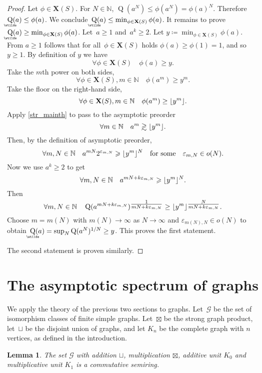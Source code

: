 \documentclass[a4paper, fleqn]{amsart}
\theoremstyle{plain}
\newtheorem{lemma}[theorem]{Lemma}
\theoremstyle{definition}
\DeclarePairedDelimiter\floor{\lfloor}{\rfloor}
\DeclareMathOperator{\subrank}{Q}
\DeclareMathOperator{\asympsubrank}{\underaccent{\wtilde}{Q}}
\newcommand{\NN}{\mathbb{N}}
\newcommand{\jeroen}[1]{#1}
\let\geqx\geqslant
\newcommand{\eps}{\varepsilon}
\newcommand{\graphs}{\mathcal{G}}
\newcommand{\aspec}{\mathbf{X}}
\let\geqx\geqslant
\newcommand{\asympgeqx}{%
  \mathrel{%
    \vphantom{\geqslant}%
    \smash{\vcenter{\doasympgeqx}}%
  }%
}
\newcommand{\doasympgeqx}{%
  \hbox{\ooalign{%
    \noalign{\kern.25ex}
    $\geqslant$\cr
    \noalign{\kern1.25ex}
    \smash{$\sim$}\cr
  }}%
}
\begin{document}
\begin{proof}
Let $\phi \in \aspec(S)$. For $N \in \NN$, $\subrank(a^N) \leq \jeroen{\phi(a^N) =  \phi(a)^N}$. Therefore $\asympsubrank(a) \leq \phi(a)$. We conclude~$\asympsubrank(a) \leq \min_{\phi \in \aspec(S)} \phi(a)$.
%
It remains to prove $\asympsubrank(a) \geq \min_{\phi \in \aspec(S)} \phi(a)$.
%
%
Let~$a\geqx 1$ and~$a^k \geqx 2$.
Let $y \coloneqq \min_{\phi \in \aspec(S)} \phi(a)$. From $a\geqx 1$ follows \jeroen{that for all~$\phi \in \aspec(S)$ holds $\phi(a) \geq \phi(1) = 1$}, and so~$y \geq1$. By definition of $y$ we have
\[
\forall \phi \in \aspec(S)\quad \phi(a) \geq y.
\]
Take the $m$th power on both sides,
\[
\forall \phi \in \aspec(S), m \in \NN\quad \phi(a^m) \geq y^m.
\]
Take the floor on the right-hand side,
\[
\forall \phi \in \aspec(S), m \in \NN\quad \phi(a^m) \geq \floor{y^m}. %
\]
Apply \cref{str_mainth} to pass to the asymptotic preorder
\[
\forall m \in \NN\quad a^m \asympgeqx \floor{y^m}.
\]
Then, by the definition of asymptotic preorder,
\[
\forall m,N \in \NN\quad a^{m N} 2^{\eps_{m,N}} \geqx \floor{y^m}^{N}\quad\textnormal{for some}\quad \eps_{m,N} \in o(N).
\]
Now we use $a^k \geqx 2$ to get
\[
\forall m,N \in \NN\quad a^{m N + k \eps_{m,N}} \geqx \floor{y^m}^{N}.
\]
Then
\[
\forall m,N \in \NN\quad \subrank(a^{mN + k \eps_{m,N}})^{\smash{\tfrac{1}{mN + k\eps_{m,N}}}} \geq \floor{y^m}^{\smash{\tfrac{N}{mN + k \eps_{m,N}}}}.
\]
Choose $m = m(N)$ with $m(N)\to\infty$ as $N \to \infty$ and $\eps_{m(N),N} \in o(N)$ to obtain~$\asympsubrank(a) = \sup_N \subrank(a^N)^{1/N} \geq y$.
This proves the first statement.

The second statement is proven similarly.
\end{proof}

%
%
%
%
%
%

%
%
%
%
%
%
%
%
%
%
%
%
%
%
%
%
%
%
%
%
%
%
%
%
%
%
%
%
%
%
%
%
%
%

\section{The asymptotic spectrum of graphs}\label{sec:graphs}
We apply the theory of the previous two sections to graphs.
Let~$\graphs$ be the set of isomorphism classes of finite simple graphs. Let~$\boxtimes$ be the strong graph product, let~$\sqcup$ be the disjoint union of graphs, and
%
%
let $K_n$ be the complete graph with $n$ vertices, as defined in the introduction.

\begin{lemma}\label{lem1}
The set $\graphs$ with addition $\sqcup$, multiplication $\boxtimes$, additive unit $K_0$ and multiplicative unit $K_1$ is a commutative semiring. %
\end{lemma}
\end{document}
